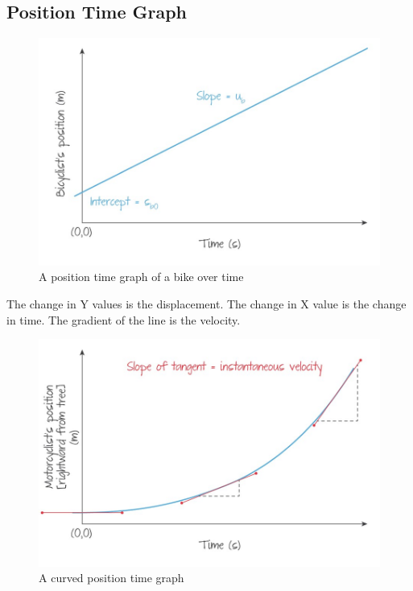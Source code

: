 \documentclass[../notes.tex]{subfiles}
\begin{document}
\subsection{Position Time Graph}
\begin{figure}[h]
\begin{center}
	\includegraphics[width=\textwidth]{./figures/position-time.jpg}
	\caption{A position time graph of a bike over time}
\end{center}
\end{figure}

The change in Y values is the displacement.
The change in X value is the change in time.
The gradient of the line is the velocity.

\begin{figure}[h]
\begin{center}
	\includegraphics[width=\textwidth]{./figures/position-time-curve.jpg}
	\caption{A curved position time graph}
\end{center}
\end{figure}
\end{document}
